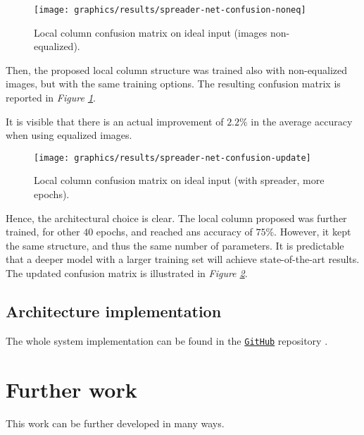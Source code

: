     \begin{figure}
        \centering
        \texttt{[image: graphics/results/spreader-net-confusion-noneq]}
        \caption{Local column confusion matrix on ideal input (images non-equalized).}\label{fig:local-confusion-noneq}
    \end{figure}
    \par{
        Then, the proposed local column structure was trained also with non-equalized images, but with the same training options. The resulting confusion matrix is reported in \emph{Figure \ref{fig:local-confusion-noneq}}.
    }
    \par{
        It is visible that there is an actual improvement of $2.2\%$ in the average accuracy when using equalized images.
    }
    \begin{figure}
        \centering
        \texttt{[image: graphics/results/spreader-net-confusion-update]}
        \caption{Local column confusion matrix on ideal input (with spreader, more epochs).}\label{fig:local-confusion-spreader-update}
    \end{figure}
    \par{
        Hence, the architectural choice is clear. The local column proposed was further trained, for other $40$ epochs, and reached ans accuracy of $75\%$. However, it kept the same structure, and thus the same number of parameters. It is predictable that a deeper model with a larger training set will achieve state-of-the-art results. The updated confusion matrix is illustrated in \emph{Figure \ref{fig:local-confusion-spreader-update}}.
    }
    \subsection{Architecture implementation}
    \par{
        The whole system implementation can be found in the \href{https://github.com/antonioterpin/wavelet_ml}{\texttt{GitHub}} repository \cite{antonioterpin:github}.
    }

\section{Further work}\label{section:further-work}
    \par{
        This work can be further developed in many ways.
    }
